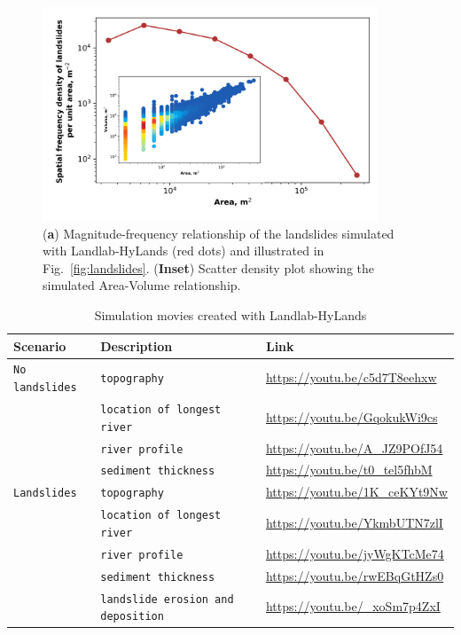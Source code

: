 \documentclass[journal abbreviation, manuscript]{copernicus}
\begin{document}
\begin{figure}[t]
\includegraphics[width=10cm]{Figures/fig14.png}
\caption{(\textbf{a}) Magnitude-frequency relationship of the landslides simulated with Landlab-HyLands (red dots) and illustrated in Fig.~\ref{fig:landslides}. (\textbf{Inset}) Scatter density plot showing the simulated Area-Volume relationship.}
\label{fig:MF-landslides}
\end{figure}

\begin{table}[htbp]
    \caption{Simulation movies created with Landlab-HyLands}
    \begin{tabular}{lll}
        \hline
        Scenario & Description & Link\\
        \hline\hline
        \verb|No landslides| &\verb|topography | & \url{https://youtu.be/c5d7T8eehxw} \\
        \verb|| &\verb|location of longest river|& \url{https://youtu.be/GqokukWi9cs} \\
        \verb|| &\verb|river profile |& \url{https://youtu.be/A_JZ9POfJ54} \\
        \verb|| &\verb|sediment thickness |& \url{https://youtu.be/t0_tel5fhbM} \\
        
        \verb|Landslides| &\verb|topography | & \url{https://youtu.be/1K_ceKYt9Nw} \\
        \verb|| &\verb|location of longest river|& \url{https://youtu.be/YkmbUTN7zlI} \\
        \verb|| &\verb|river profile |& \url{https://youtu.be/jyWgKTcMe74} \\
        \verb|| &\verb|sediment thickness |& \url{https://youtu.be/rwEBqGtHZs0} \\
        \verb|| &\verb|landslide erosion and deposition |& \url{https://youtu.be/_xoSm7p4ZxI} \\
    \hline
   \end{tabular}
   \label{tab:LS-movies}
\end{table} 
\end{document}
